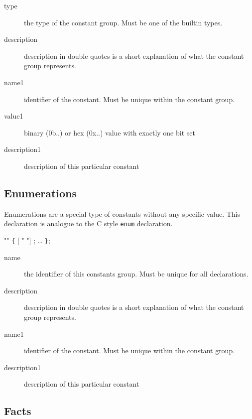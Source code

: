 \documentclass[a4paper,11pt,twoside]{report}
\begin{document}
{{\begin{description}
    \item [type] the type of the constant group. Must be one of the builtin 
    types.
    
    \item [description] description in double quotes is a short explanation of
    what the constant group represents.
    
    \item [name1] identifier of the constant. Must be unique within the 
    constant group. 
    
    \item [value1] binary (0b..) or hex (0x..) value with exactly one bit set
    
    \item [description1] description of this particular constant
    
\end{description}

\subsection{Enumerations}

Enumerations are a special type of constants without any specific value. This
declaration is analogue to the C style \texttt{enum} declaration.

\begin{syntax}
  "" \verb+{+
     [ " "] ;
    \ldots
\verb+}+;
\end{syntax}

\begin{description}
    \item[name] the identifier of this constants group. Must be unique for all 
    declarations.
    
    \item [description] description in double quotes is a short explanation of
    what the constant group represents.
    
    \item [name1] identifier of the constant. Must be unique within the 
    constant group.   
    
    \item [description1] description of this particular constant
    
\end{description}

\subsection{Facts}

}}
\end{document}
